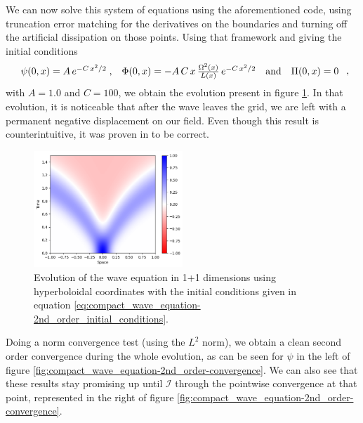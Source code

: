 We can now solve this system of equations using the aforementioned code, using truncation error matching for the derivatives on the boundaries and turning off the artificial dissipation on those points. Using that framework and giving the initial conditions
\begin{equation}
    \begin{array}{c c c c}
        \psi(0,x) = A \, e^{-C \, x^2/2} \; , & \Phi(0,x) = - A \,C \, x \, \frac{\Omega^2(x)}{L(x)} \, e^{-C \, x^2/2} & \text{and} & \Pi(0,x) = 0
    \end{array} \; ,
    \label{eq:compact_wave_equation-2nd_order_initial_conditions}
\end{equation}
with $A = 1.0$ and $C = 100$, we obtain the evolution present in figure \ref{fig:compact_wave_equation-2nd_order}. In that evolution, it is noticeable that after the wave leaves the grid, we are left with a permanent negative displacement on our field. Even though this result is counterintuitive, it was proven in \cite{} to be correct.

\begin{figure}[t!]
    \centering
    \includegraphics[width=0.5\textwidth]{Images/Wave_Equation_1+1-Solution.png}
    \caption{Evolution of the wave equation in 1+1 dimensions using hyperboloidal coordinates with the initial conditions given in equation \eqref{eq:compact_wave_equation-2nd_order_initial_conditions}.}
    \label{fig:compact_wave_equation-2nd_order}
\end{figure}

Doing a norm convergence test (using the $L^2$ norm), we obtain a clean second order convergence during the whole evolution, as can be seen for $\psi$ in the left of figure \ref{fig:compact_wave_equation-2nd_order-convergence}. We can also see that these results stay promising up until $\mathscr{I}$ through the pointwise convergence at that point, represented in the right of figure \ref{fig:compact_wave_equation-2nd_order-convergence}.


